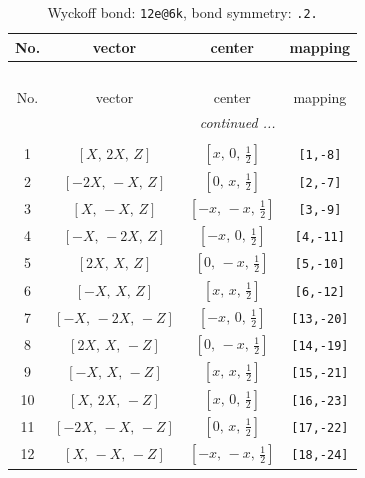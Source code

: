 \documentclass[fleqn,8pt]{jsarticle}
\begin{document}
\renewcommand{\arraystretch}{1.2}
\begin{longtable}{cccc}
\caption{Wyckoff bond: {\tt 12e@6k}, bond symmetry: {\tt .2.}}
 \\
 \hline \hline
No. & vector & center & mapping \\ \hline \endfirsthead

\multicolumn{3}{l}{\tablename\ \thetable{}} \\
 \hline \hline
No. & vector & center & mapping \\ \hline \endhead

 \hline \hline
\multicolumn{3}{r}{\footnotesize\it continued ...} \\ \endfoot

 \hline \hline
\multicolumn{3}{r}{} \\ \endlastfoot

1 & $\left[ X,\, 2 X,\, Z \right]$ & $\left[ x,\, 0,\, \frac{1}{2} \right]$ & {\tt [1,-8]} \\ \hline
2 & $\left[ - 2 X,\, - X,\, Z \right]$ & $\left[ 0,\, x,\, \frac{1}{2} \right]$ & {\tt [2,-7]} \\ \hline
3 & $\left[ X,\, - X,\, Z \right]$ & $\left[ - x,\, - x,\, \frac{1}{2} \right]$ & {\tt [3,-9]} \\ \hline
4 & $\left[ - X,\, - 2 X,\, Z \right]$ & $\left[ - x,\, 0,\, \frac{1}{2} \right]$ & {\tt [4,-11]} \\ \hline
5 & $\left[ 2 X,\, X,\, Z \right]$ & $\left[ 0,\, - x,\, \frac{1}{2} \right]$ & {\tt [5,-10]} \\ \hline
6 & $\left[ - X,\, X,\, Z \right]$ & $\left[ x,\, x,\, \frac{1}{2} \right]$ & {\tt [6,-12]} \\ \hline
7 & $\left[ - X,\, - 2 X,\, - Z \right]$ & $\left[ - x,\, 0,\, \frac{1}{2} \right]$ & {\tt [13,-20]} \\ \hline
8 & $\left[ 2 X,\, X,\, - Z \right]$ & $\left[ 0,\, - x,\, \frac{1}{2} \right]$ & {\tt [14,-19]} \\ \hline
9 & $\left[ - X,\, X,\, - Z \right]$ & $\left[ x,\, x,\, \frac{1}{2} \right]$ & {\tt [15,-21]} \\ \hline
10 & $\left[ X,\, 2 X,\, - Z \right]$ & $\left[ x,\, 0,\, \frac{1}{2} \right]$ & {\tt [16,-23]} \\ \hline
11 & $\left[ - 2 X,\, - X,\, - Z \right]$ & $\left[ 0,\, x,\, \frac{1}{2} \right]$ & {\tt [17,-22]} \\ \hline
12 & $\left[ X,\, - X,\, - Z \right]$ & $\left[ - x,\, - x,\, \frac{1}{2} \right]$ & {\tt [18,-24]} \\
\end{longtable}
\end{document}
